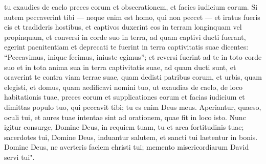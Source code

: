 \begin{biblechapter}
\verse tu exaudies de caelo preces eorum et obsecrationem, et facies iudicium eorum. 
\verse Si autem peccaverint tibi — neque enim est homo, qui non peccet — et iratus fueris eis et tradideris hostibus, et captivos duxerint eos in terram longinquam vel propinquam, 
\verse et conversi in corde suo in terra, ad quam captivi ducti fuerant, egerint paenitentiam et deprecati te fuerint in terra captivitatis suae dicentes: “Peccavimus, inique fecimus, iniuste egimus”; 
\verse et reversi fuerint ad te in toto corde suo et in tota anima sua in terra captivitatis suae, ad quam ducti sunt, et oraverint te contra viam terrae suae, quam dedisti patribus eorum, et urbis, quam elegisti, et domus, quam aedificavi nomini tuo,  
\verse ut exaudias de caelo, de loco habitationis tuae, preces eorum et supplicationes eorum et facias iudicium et dimittas populo tuo, qui peccavit tibi; 
\verse tu es enim Deus meus. Aperiantur, quaeso, oculi tui, et aures tuae intentae sint ad orationem, quae fit in loco isto. 
\verse Nunc igitur consurge, Domine Deus, in requiem tuam, tu et arca fortitudinis tuae; sacerdotes tui, Domine Deus, induantur salutem, et sancti tui laetentur in bonis. 
\verse Domine Deus, ne averteris faciem christi tui; memento misericordiarum David servi tui". 
\end{biblechapter}

